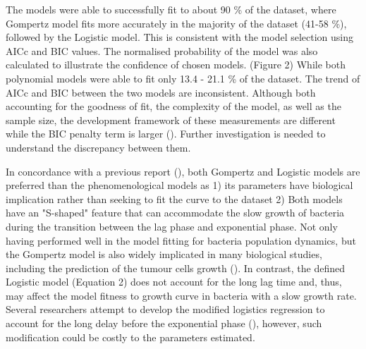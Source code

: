 \documentclass[12pt]{article}
\begin{document}
\begin{linenumbers}
 \vspace{0.5cm}
 
 \noindent The models were able to successfully fit to about 90 \% of the dataset, where Gompertz model fits more accurately in the majority of the dataset (41-58 \%), followed by the Logistic model. This is consistent with the model selection using AICc and BIC values. The normalised probability of the model was also calculated to illustrate the confidence of chosen models. (Figure 2) While both polynomial models were able to fit only 13.4 - 21.1 \% of the dataset. The trend of AICc and BIC between the two models are inconsistent. Although both accounting for the goodness of fit, the complexity of the model, as well as the sample size, the development framework of these measurements are different while the BIC penalty term is larger (\cite{wagenmakers_aic_2004}). Further investigation is needed to understand the discrepancy between them.
 
 \vspace{0.5cm}
 
 \noindent In concordance with a previous report (\cite{peleg_microbial_2011}), both Gompertz and Logistic models are preferred than the phenomenological models as 1) its parameters have biological implication rather than seeking to fit the curve to the dataset 2) Both models have an "S-shaped" feature that can accommodate the slow growth of bacteria during the transition between the lag phase and exponential phase. Not only having performed well in the model fitting for bacteria population dynamics, but the Gompertz model is also widely implicated in many biological studies, including the prediction of the tumour cells growth (\cite{benzekry_classical_2014}). In contrast, the defined Logistic model (Equation 2) does not account for the long lag time and, thus, may affect the model fitness to growth curve in bacteria with a slow growth rate. Several researchers attempt to develop the modified logistics regression to account for the long delay before the exponential phase (\cite{oscar_development_2005,koseki_alternative_2012}), however, such modification could be costly to the parameters estimated.
 
 \vspace{0.5cm}
 

\end{linenumbers}
\end{document}
